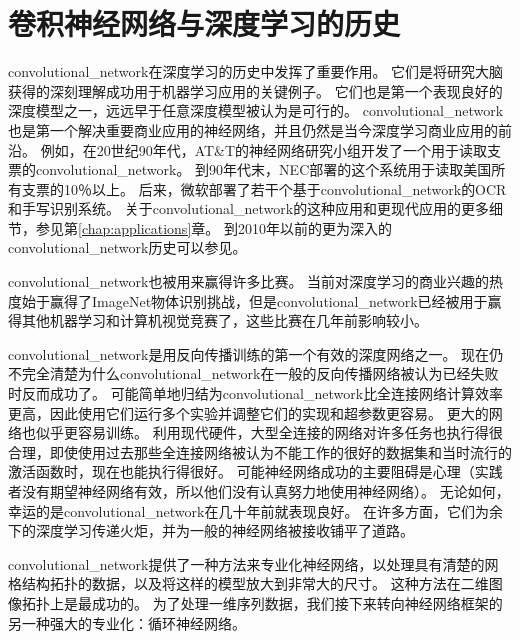 \section{卷积神经网络与深度学习的历史}
\label{sec:convolutional_networks_and_the_history_of_deep_learning}
 
 
\gls{convolutional_network}在深度学习的历史中发挥了重要作用。
它们是将研究大脑获得的深刻理解成功用于机器学习应用的关键例子。
它们也是第一个表现良好的深度模型之一，远远早于任意深度模型被认为是可行的。
\gls{convolutional_network}也是第一个解决重要商业应用的神经网络，并且仍然是当今深度学习商业应用的前沿。
例如，在20世纪90年代，AT\&T的神经网络研究小组开发了一个用于读取支票的\gls{convolutional_network}\citep{chapter-gradient-document-2001}。
到90年代末，NEC部署的这个系统用于读取美国所有支票的10％以上。
后来，微软部署了若干个基于\gls{convolutional_network}的OCR和手写识别系统\citep{simard-03-small}。 
关于\gls{convolutional_network}的这种应用和更现代应用的更多细节，参见第\ref{chap:applications}章。
到2010年以前的更为深入的\gls{convolutional_network}历史可以参见\citep{Lecun_convolutionalnetworks}。

\gls{convolutional_network}也被用来赢得许多比赛。
当前对深度学习的商业兴趣的热度始于\cite{Krizhevsky-2012-small}赢得了ImageNet物体识别挑战，但是\gls{convolutional_network}已经被用于赢得其他机器学习和计算机视觉竞赛了，这些比赛在几年前影响较小。
 
 
\gls{convolutional_network}是用反向传播训练的第一个有效的深度网络之一。
现在仍不完全清楚为什么\gls{convolutional_network}在一般的反向传播网络被认为已经失败时反而成功了。
可能简单地归结为\gls{convolutional_network}比全连接网络计算效率更高，因此使用它们运行多个实验并调整它们的实现和超参数更容易。
更大的网络也似乎更容易训练。
利用现代硬件，大型全连接的网络对许多任务也执行得很合理，即使使用过去那些全连接网络被认为不能工作的很好的数据集和当时流行的激活函数时，现在也能执行得很好。
可能神经网络成功的主要阻碍是心理（实践者没有期望神经网络有效，所以他们没有认真努力地使用神经网络）。
无论如何，幸运的是\gls{convolutional_network}在几十年前就表现良好。
在许多方面，它们为余下的深度学习传递火炬，并为一般的神经网络被接收铺平了道路。

\gls{convolutional_network}提供了一种方法来专业化神经网络，以处理具有清楚的网格结构拓扑的数据，以及将这样的模型放大到非常大的尺寸。 
这种方法在二维图像拓扑上是最成功的。
为了处理一维序列数据，我们接下来转向神经网络框架的另一种强大的专业化：循环神经网络。

 
 










